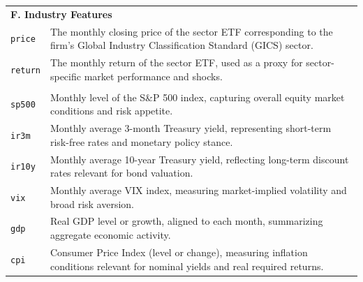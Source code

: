 \documentclass[12pt]{article}
\begin{document}
\begin{longtable}{l p{10cm}}
\multicolumn{2}{l}{\textbf{F. Industry Features}} \\
\texttt{price} & The monthly closing price of the sector ETF corresponding to the firm's Global Industry Classification Standard (GICS) sector. \\
\texttt{return} & The monthly return of the sector ETF, used as a proxy for sector-specific market performance and shocks. \\
\addlinespace
\addlinespace

\multicolumn{2}{l}{\textbf{G. Macroeconomic Features}} \\
\texttt{sp500} & Monthly level of the S\&P 500 index, capturing overall equity market conditions and risk appetite. \\
\texttt{ir3m} & Monthly average 3-month Treasury yield, representing short-term risk-free rates and monetary policy stance. \\
\texttt{ir10y} & Monthly average 10-year Treasury yield, reflecting long-term discount rates relevant for bond valuation. \\
\texttt{vix} & Monthly average VIX index, measuring market-implied volatility and broad risk aversion. \\
\texttt{gdp} & Real GDP level or growth, aligned to each month, summarizing aggregate economic activity. \\
\texttt{cpi} & Consumer Price Index (level or change), measuring inflation conditions relevant for nominal yields and real required returns. \\
\end{longtable}
\end{document}
